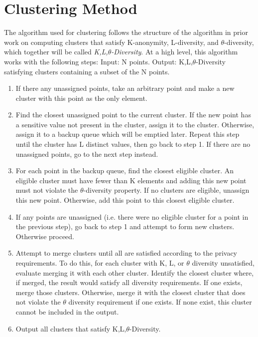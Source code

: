 \section{Clustering Method}
The algorithm used for clustering follows the structure of the algorithm in prior work\cite{yangEnhanced} on computing clusters that satisfy K-anonymity, L-diversity, and $\theta$-diversity, which together will be called \emph{K,L,$\theta$-Diversity}. At a high level, this algorithm works with the following steps:
Input: N points.
Output: K,L,$\theta$-Diversity satisfying clusters containing a subset of the N points.
\begin{enumerate}
    \item If there any unassigned points, take an arbitrary point and make a new cluster with this point as the only element.
    \item Find the closest unassigned point to the current cluster. If the new point has a sensitive value not present in the cluster, assign it to the cluster. Otherwise, assign it to a backup queue which will be emptied later. Repeat this step until the cluster has L distinct values, then go back to step 1. If there are no unassigned points, go to the next step instead.
    \item For each point in the backup queue, find the closest eligible cluster. An eligible cluster must have fewer than K elements and adding this new point must not violate the $\theta$-diversity property. If no clusters are eligible, unassign this new point. Otherwise, add this point to this closest eligible cluster.
    \item If any points are unassigned (i.e. there were no eligible cluster for a point in the previous step), go back to step 1 and attempt to form new clusters. Otherwise proceed.
    \item Attempt to merge clusters until all are satisfied according to the privacy requirements. To do this, for each cluster with K, L, or $\theta$ diversity unsatisfied, evaluate merging it with each other cluster. Identify the closest cluster where, if merged, the result would satisfy all diversity requirements. If one exists, merge those clusters. Otherwise, merge it with the closest cluster that does not violate the $\theta$ diversity requirement if one exists. If none exist, this cluster cannot be included in the output.
    \item Output all clusters that satisfy K,L,$\theta$-Diversity.
\end{enumerate}

